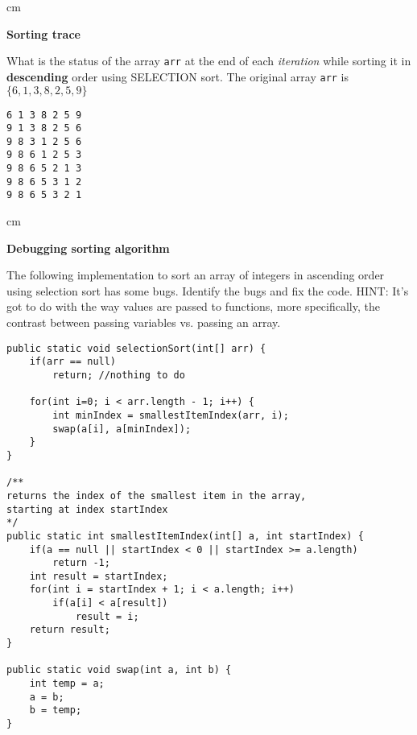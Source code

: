 \begin{center}
\end{center}

\begin{questions}

 cm 

\question  \textbf{Sorting trace} \vskip 0.5cm

What is the status of the array \texttt{arr} at the end of each \emph{iteration} while sorting it in \textbf{descending} order using SELECTION sort. The original array \texttt{arr} is $\{6, 1, 3, 8, 2, 5, 9\}$

\begin{solution}
\begin{verbatim}
6 1 3 8 2 5 9
9 1 3 8 2 5 6
9 8 3 1 2 5 6
9 8 6 1 2 5 3
9 8 6 5 2 1 3
9 8 6 5 3 1 2
9 8 6 5 3 2 1
\end{verbatim}
\end{solution}

 cm 

\question  \textbf{Debugging sorting algorithm} \vskip 0.5cm

The following implementation to sort an array of integers in ascending order using selection sort has some bugs. Identify the bugs and fix the code. HINT: It's got to do with the way values are passed to functions, more specifically, the contrast between passing variables vs. passing an array.

\begin{lstlisting}
public static void selectionSort(int[] arr) {
	if(arr == null)
		return; //nothing to do
		
	for(int i=0; i < arr.length - 1; i++) {
		int minIndex = smallestItemIndex(arr, i);
		swap(a[i], a[minIndex]);
	}
}

/**
returns the index of the smallest item in the array,
starting at index startIndex
*/
public static int smallestItemIndex(int[] a, int startIndex) {
	if(a == null || startIndex < 0 || startIndex >= a.length)
		return -1;
	int result = startIndex;
	for(int i = startIndex + 1; i < a.length; i++)
		if(a[i] < a[result])
			result = i;
	return result;
}

public static void swap(int a, int b) {
	int temp = a;
	a = b;
	b = temp;
}
\end{lstlisting}


\end{questions}
